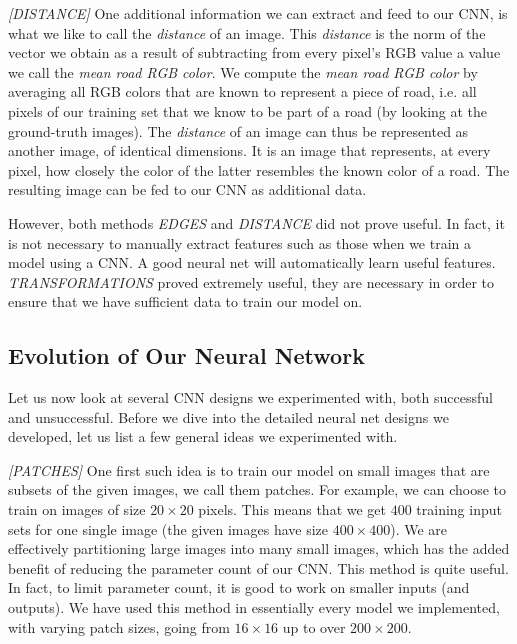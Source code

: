 \documentclass[10pt,conference,compsocconf]{IEEEtran}
\begin{document}
\smallskip
\textit{[DISTANCE]}   
One additional information we can extract and feed to our CNN, is what we like to call the \textit{distance} of an image. This  \textit{distance} is the norm of the vector we obtain as a result of subtracting from every pixel's RGB value a value we call the \textit{mean road RGB color}. We compute the \textit{mean road RGB color} by averaging all RGB colors that are known to represent a piece of road, i.e. all pixels of our training set that we know to be part of a road (by looking at the ground-truth images). The \textit{distance} of an image can thus be represented as another image, of identical dimensions. It is an image that represents, at every pixel, how closely the color of the latter resembles the known color of a road. The resulting image can be fed to our CNN as additional data.

\smallskip
However, both methods \textit{EDGES} and \textit{DISTANCE} did not prove useful. In fact, it is not necessary to manually extract features such as those when we train a model using a CNN. A good neural net will automatically learn useful features. \textit{TRANSFORMATIONS} proved extremely useful, they are necessary in order to ensure that we have sufficient data to train our model on.



\subsection{Evolution of Our Neural Network} 
\label{ssec:technique}

Let us now look at several CNN designs we experimented with, both successful and unsuccessful. Before we dive into the detailed neural net designs we developed, let us list a few general ideas we experimented with.

\smallskip
\textit{[PATCHES]}   
One first such idea is to train our model on small images that are subsets of the given images, we call them patches. For example, we can choose to train on images of size $20 \times 20$ pixels. This means that we get $400$ training input sets for one single image (the given images have size $400 \times 400$). We are effectively partitioning large images into many small images, which has the added benefit of reducing the parameter count of our CNN. This method is quite useful. In fact, to limit parameter count, it is good to work on smaller inputs (and outputs). We have used this method in essentially every model we implemented, with varying patch sizes, going from $16 \times 16$ up to over $200 \times 200$.
\end{document}
